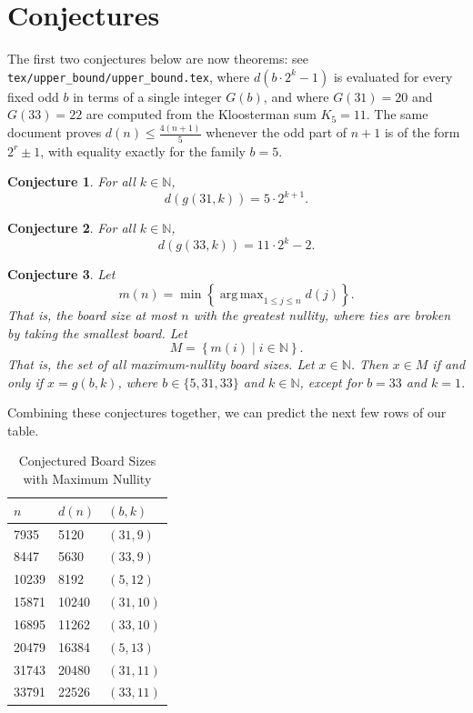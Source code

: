 \documentclass{article}
\newtheorem{conjecture}{Conjecture}
\newcommand{\N}{\mathbb{N}}
\DeclareMathOperator*{\argmax}{arg\,max}
\begin{document}
	\section{Conjectures}
	The first two conjectures below are now theorems: see \texttt{tex/upper\_bound/upper\_bound.tex}, where $d(b \cdot 2^k - 1)$ is evaluated for every fixed odd $b$ in terms of a single integer $G(b)$, and where $G(31) = 20$ and $G(33) = 22$ are computed from the Kloosterman sum $K_5 = 11$.
	The same document proves $d(n) \leq \frac{4(n+1)}{5}$ whenever the odd part of $n+1$ is of the form $2^r \pm 1$, with equality exactly for the family $b = 5$.

	\begin{conjecture}
		For all $k \in \N$,
		\begin{equation*}
			d(g(31,k)) = 5\cdot2^{k+1}.
		\end{equation*}
	\end{conjecture}

	\begin{conjecture}
		For all $k \in \N$,
		\begin{equation*}
			d(g(33,k)) = 11\cdot2^{k} - 2.
		\end{equation*}
	\end{conjecture}

	\begin{conjecture}
		Let
		\begin{equation*}
			m(n) = \min\left\{\argmax_{1 \leq j \leq n} d(j)\right\}.
		\end{equation*}
		That is, the board size at most $n$ with the greatest nullity, where ties are broken by taking the smallest board.
		Let
		\begin{equation*}
			M = \left\{m(i) \mid i \in \N \right\}.
		\end{equation*}
		That is, the set of all maximum-nullity board sizes.
		Let $x \in \N$.
		Then $x \in M$ if and only if $x = g(b,k)$, where $b \in \{5,31,33\}$ and $k \in \N$, except for $b=33$ and $k=1$.
	\end{conjecture}

	Combining these conjectures together, we can predict the next few rows of our table.
	\begin{table}[H]
		\centering
		\begin{tabular}{|l|l|l|}
			\hline
			$n$ & $d(n)$ & $(b,k)$ \\
			\hline\hline
			7935 & 5120 & $(31,9)$ \\
			\hline
			8447 & 5630 & $(33,9)$ \\
			\hline
			10239 & 8192 & $(5,12)$ \\
			\hline
			15871 & 10240 & $(31,10)$ \\
			\hline
			16895 & 11262 & $(33,10)$ \\
			\hline
			20479 & 16384 & $(5,13)$ \\
			\hline
			31743 & 20480 & $(31,11)$ \\
			\hline
			33791 & 22526 & $(33,11)$ \\
			\hline
		\end{tabular}
		\caption{Conjectured Board Sizes with Maximum Nullity}
	\end{table}	
\end{document}
